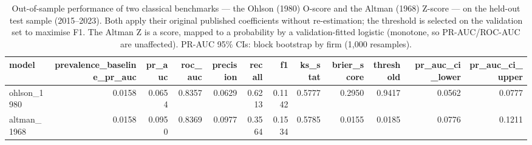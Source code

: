 \begin{table}[htbp]
\centering
\caption{Out-of-sample performance of two classical benchmarks — the Ohlson (1980) O-score and the Altman (1968) Z-score — on the held-out test sample (2015--2023). Both apply their original published coefficients without re-estimation; the threshold is selected on the validation set to maximise F1. The Altman Z is a score, mapped to a probability by a validation-fitted logistic (monotone, so PR-AUC/ROC-AUC are unaffected). PR-AUC 95\% CIs: block bootstrap by firm (1{,}000 resamples).}
\label{tab:classical_benchmarks}
\small
\begin{tabular}{lrrrrrrrrrrr}
\toprule
model & prevalence\_baseline\_pr\_auc & pr\_auc & roc\_auc & precision & recall & f1 & ks\_stat & brier\_score & threshold & pr\_auc\_ci\_lower & pr\_auc\_ci\_upper \\
\midrule
ohlson\_1980 & 0.0158 & 0.0654 & 0.8357 & 0.0629 & 0.6213 & 0.1142 & 0.5777 & 0.2950 & 0.9417 & 0.0562 & 0.0777 \\
altman\_1968 & 0.0158 & 0.0950 & 0.8369 & 0.0977 & 0.3564 & 0.1534 & 0.5785 & 0.0155 & 0.0185 & 0.0776 & 0.1211 \\
\bottomrule
\end{tabular}
\end{table}
